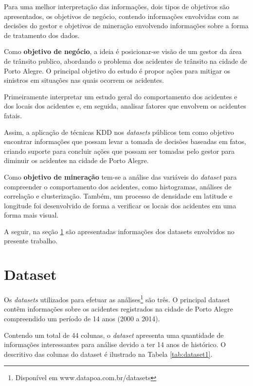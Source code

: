 \documentclass[11pt,article,oneside,a4paper]{abntex2}
\begin{document}
Para uma melhor interpretação das informações, dois tipos de objetivos são apresentados, os objetivos de negócio, contendo informações envolvidas com as decisões do gestor e objetivos de mineração envolvendo informações sobre a forma de tratamento dos dados.

Como \textbf{objetivo de negócio}, a ideia é posicionar-se visão de um gestor da área de trânsito publico, abordando o problema dos acidentes de trânsito na cidade de Porto Alegre. O principal objetivo do estudo é propor ações para mitigar os sinistros em situações nas quais ocorrem os acidentes.

Primeiramente interpretar um estudo geral do comportamento dos acidentes e dos locais dos acidentes e, em seguida, analisar fatores que envolvem os acidentes fatais. 

Assim, a aplicação de técnicas KDD nos \textit{datasets} públicos tem como objetivo encontrar informações que possam levar a tomada de decisões baseadas em fatos, criando suporte para concluir ações que possam ser tomadas pelo gestor para diminuir os acidentes na cidade de Porto Alegre.

Como \textbf{objetivo de mineração} tem-se a análise das variáveis do \textit{dataset} para compreender o comportamento dos acidentes, como histogramas, análises de correlação e clusterização. Também, um processo de densidade em latitude e longitude foi desenvolvido de forma a verificar os locais dos acidentes em uma forma mais visual.

A seguir, na seção \ref{sec:dataset} são apresentadas informações dos datasets envolvidos no presente trabalho.

\section{Dataset}
\label{sec:dataset}

Os \textit{datasets} utilizados para efetuar as análises\footnote{Disponível em www.datapoa.com.br/datasets} são três. O principal dataset contêm informações sobre os acidentes registrados na cidade de Porto Alegre compreendido um período de 14 anos (2000 a 2014). 

Contendo um total de 44 colunas, o \textit{dataset} apresenta uma quantidade de informações interessantes para análise devido a ter 14 anos de histórico. O descritivo das colunas do dataset é ilustrado na Tabela \ref{tab:dataset1}.
\end{document}
